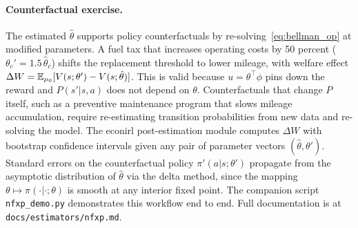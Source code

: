 \documentclass[11pt]{article}
\begin{document}
\paragraph{Counterfactual exercise.}
The estimated $\hat\theta$ supports policy counterfactuals by re-solving~\eqref{eq:bellman_op} at modified parameters.
A fuel tax that increases operating costs by 50 percent ($\theta_c' = 1.5\,\hat\theta_c$) shifts the replacement threshold to lower mileage, with welfare effect $\Delta W = \mathbb{E}_{\mu_0}[V(s;\theta') - V(s;\hat\theta)]$.
This is valid because $u = \theta^\top\phi$ pins down the reward and $P(s'|s,a)$ does not depend on $\theta$.
Counterfactuals that change $P$ itself, such as a preventive maintenance program that slows mileage accumulation, require re-estimating transition probabilities from new data and re-solving the model.
The econirl post-estimation module computes $\Delta W$ with bootstrap confidence intervals given any pair of parameter vectors $(\hat\theta, \theta')$.
Standard errors on the counterfactual policy $\pi'(a|s;\theta')$ propagate from the asymptotic distribution of $\hat\theta$ via the delta method, since the mapping $\theta \mapsto \pi(\cdot|\cdot;\theta)$ is smooth at any interior fixed point.
The companion script \texttt{nfxp\_demo.py} demonstrates this workflow end to end.
Full documentation is at \texttt{docs/estimators/nfxp.md}.
\end{document}
